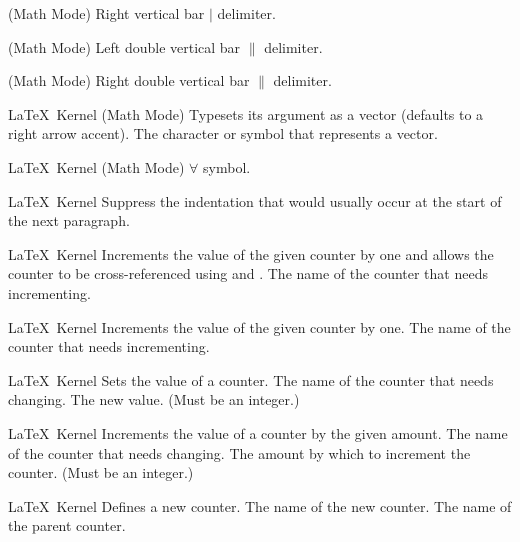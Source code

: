 %
 {}%
 { (Math Mode)}%
 {Right vertical bar \ensuremath{\rvert} delimiter.}%
 {}

%
 {}%
 { (Math Mode)}%
 {Left double vertical bar \ensuremath{\lVert} delimiter.}%
 {}

%
 {}%
 { (Math Mode)}%
 {Right double vertical bar \ensuremath{\rVert} delimiter.}%
 {}

%
 {}%
 {\LaTeX\ Kernel (Math Mode)}%
 {Typesets its argument as a vector (defaults to a right arrow
   accent).}%
 {%
   \BeginArgList
     The character or symbol that represents a vector.
   \EndArgList
 }

%
 {}%
 {\LaTeX\ Kernel (Math Mode)}%
 { \ensuremath{\forall} symbol.}%
 {}


%
 {}%
 {\LaTeX\ Kernel}%
 {Suppress the indentation that would usually occur at the start of
  the next paragraph.}%
 {}

%
 {}%
 {\LaTeX\ Kernel}%
 {Increments the value of the given counter by one and allows the
  counter to be cross-referenced using  and .}%
 {%
   \BeginArgList
     The name of the counter that needs
     incrementing.
   \EndArgList
 }

%
 {}%
 {\LaTeX\ Kernel}%
 {Increments the value of the given counter by one.}%
 {%
   \BeginArgList
     The name of the counter that needs
     incrementing.
   \EndArgList
 }

%
 {}%
 {\LaTeX\ Kernel}%
 {Sets the value of a counter.}%
 {%
   \BeginArgList
     The name of the counter that needs
     changing.
     The new value. (Must be an integer.)
   \EndArgList
 }

%
 {}%
 {\LaTeX\ Kernel}%
 {Increments the value of a counter by the given amount.}%
 {%
   \BeginArgList
     The name of the counter that needs
     changing.
     The amount by which to increment the counter. (Must be an integer.)
   \EndArgList
 }

%
 {}%
 {\LaTeX\ Kernel}%
 {Defines a new counter.}%
 {%
   \BeginArgList
     The name of the new counter.
     The name of the parent counter.
   \EndArgList
 }


